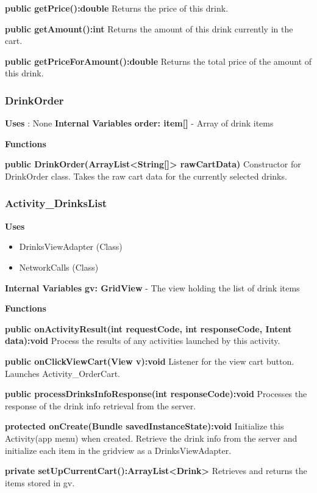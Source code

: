 \documentclass [10pt]{article}
\begin{document}
\textbf{public getPrice():double}
Returns the price of this drink.

\textbf{public getAmount():int}
Returns the amount of this drink currently in the cart.

\textbf{public getPriceForAmount():double}
Returns the total price of the amount of this drink.

\subsubsection{DrinkOrder}
\textbf{Uses} : None
\textbf{Internal Variables}
\textbf{order: item[]} - Array of drink items

\textbf{Functions}

\textbf{public DrinkOrder(ArrayList<String[]> rawCartData)}
Constructor for DrinkOrder class. Takes the raw cart data for the currently selected drinks.

\subsubsection{Activity\_DrinksList}

\textbf{Uses}

\begin{itemize}
	\item DrinksViewAdapter (Class)
	\item NetworkCalls (Class)
\end{itemize}

\textbf{Internal Variables}
\textbf{gv: GridView} - The view holding the list of drink items

\textbf{Functions}

\textbf{public onActivityResult(int requestCode, int responseCode, Intent data):void}
Process the results of any activities launched by this activity.

\textbf{public onClickViewCart(View v):void}
Listener for the view cart button. Launches Activity\_OrderCart.

\textbf{public processDrinksInfoResponse(int responseCode):void}
Processes the response of the drink info retrieval from the server.

\textbf{protected onCreate(Bundle savedInstanceState):void}
Initialize this Activity(app menu) when created. Retrieve the drink info from the server and initialize each item in the gridview as a DrinksViewAdapter. 

\textbf{private setUpCurrentCart():ArrayList<Drink>}
Retrieves and returns the items stored in gv.
\end{document}
